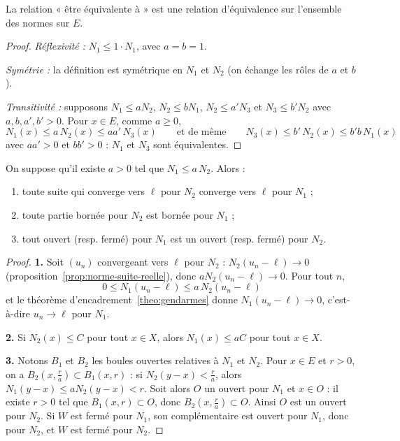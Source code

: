 \begin{prop}
\label{prop:normes-equivalentes-relation}
La relation « être équivalente à » est une relation d'équivalence sur l'ensemble des normes sur $E$.
\end{prop}

\begin{proof}
\emph{Réflexivité :} $N_1\leq 1\cdot N_1$, avec $a=b=1$.

\emph{Symétrie :} la définition est symétrique en $N_1$ et $N_2$ (on échange les rôles de $a$ et $b$).

\emph{Transitivité :} supposons $N_1\leq aN_2$, $N_2\leq bN_1$, $N_2\leq a'N_3$ et $N_3\leq b'N_2$ avec $a,b,a',b'>0$. Pour $x\in E$, comme $a\geq 0$,
\[N_1(x)\leq a\,N_2(x)\leq a a'\,N_3(x) \qquad\text{et de même}\qquad N_3(x)\leq b'\,N_2(x)\leq b'b\,N_1(x)\]
avec $aa'>0$ et $bb'>0$ : $N_1$ et $N_3$ sont équivalentes.
\end{proof}

\begin{prop}
\label{prop:comparaison-normes}
On suppose qu'il existe $a>0$ tel que $N_1\leq a\,N_2$. Alors :
\begin{enumerate}
\item toute suite qui converge vers $\ell$ pour $N_2$ converge vers $\ell$ pour $N_1$ ;
\item toute partie bornée pour $N_2$ est bornée pour $N_1$ ;
\item tout ouvert (resp. fermé) pour $N_1$ est un ouvert (resp. fermé) pour $N_2$.
\end{enumerate}
\end{prop}

\begin{proof}
\textbf{1.} Soit $(u_n)$ convergeant vers $\ell$ pour $N_2$ : $N_2(u_n-\ell)\to 0$ (proposition~\ref{prop:norme-suite-reelle}), donc $aN_2(u_n-\ell)\to 0$. Pour tout $n$,
\[0\leq N_1(u_n-\ell)\leq a\,N_2(u_n-\ell)\]
et le théorème d'encadrement~\ref{theo:gendarmes} donne $N_1(u_n-\ell)\to 0$, c'est-à-dire $u_n\to\ell$ pour $N_1$.

\textbf{2.} Si $N_2(x)\leq C$ pour tout $x\in X$, alors $N_1(x)\leq aC$ pour tout $x\in X$.

\textbf{3.} Notons $B_1$ et $B_2$ les boules ouvertes relatives à $N_1$ et $N_2$. Pour $x\in E$ et $r>0$, on a $B_2(x,\frac ra)\subset B_1(x,r)$ : si $N_2(y-x)<\frac ra$, alors $N_1(y-x)\leq aN_2(y-x)<r$. Soit alors $O$ un ouvert pour $N_1$ et $x\in O$ : il existe $r>0$ tel que $B_1(x,r)\subset O$, donc $B_2(x,\frac ra)\subset O$. Ainsi $O$ est un ouvert pour $N_2$. Si $W$ est fermé pour $N_1$, son complémentaire est ouvert pour $N_1$, donc pour $N_2$, et $W$ est fermé pour $N_2$.
\end{proof}


